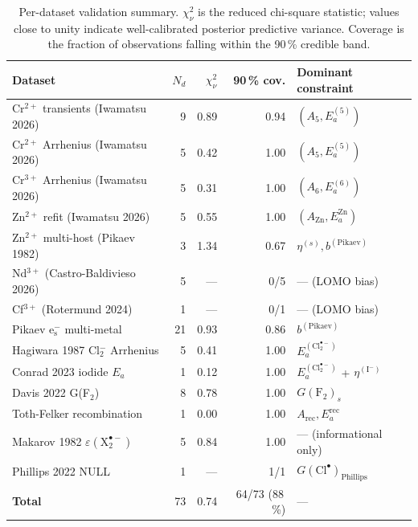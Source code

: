 \documentclass[11pt]{article}
\theoremstyle{plain}
\theoremstyle{definition}
\theoremstyle{remark}
\newcommand{\Clt}{\ensuremath{\mathrm{Cl}_2^{\bullet-}}\xspace}
\newcommand{\Xt}{\ensuremath{\mathrm{X}_2^{\bullet-}}\xspace}
\newcommand{\Ea}{E_a}
\begin{document}
\begin{table}[h!]
\centering
\caption{Per-dataset validation summary.  $\chi^2_\nu$ is the reduced
chi-square statistic; values close to unity indicate well-calibrated
posterior predictive variance.  Coverage is the fraction of observations
falling within the 90\,\% credible band.}
\label{tab:chi2}
\small
\begin{tabular}{lrrrl}
\toprule
Dataset                              & $N_d$ & $\chi^2_\nu$ & 90\,\% cov. & Dominant constraint \\
\midrule
Cr$^{2+}$ transients (Iwamatsu 2026) & 9     & 0.89  & 0.94 & $(A_5, \Ea^{(5)})$ \\
Cr$^{2+}$ Arrhenius (Iwamatsu 2026)  & 5     & 0.42  & 1.00 & $(A_5, \Ea^{(5)})$ \\
Cr$^{3+}$ Arrhenius (Iwamatsu 2026)  & 5     & 0.31  & 1.00 & $(A_6, \Ea^{(6)})$ \\
Zn$^{2+}$ refit (Iwamatsu 2026)      & 5     & 0.55  & 1.00 & $(A_{\mathrm{Zn}}, \Ea^{\mathrm{Zn}})$ \\
Zn$^{2+}$ multi-host (Pikaev 1982)   & 3     & 1.34  & 0.67 & $\eta^{(s)}, b^{(\mathrm{Pikaev})}$ \\
Nd$^{3+}$ (Castro-Baldivieso 2026)   & 5     & ---   & 0/5  & --- (LOMO bias) \\
Cf$^{3+}$ (Rotermund 2024)           & 1     & ---   & 0/1  & --- (LOMO bias) \\
Pikaev e$_{\mathrm{s}}^-$ multi-metal & 21   & 0.93  & 0.86 & $b^{(\mathrm{Pikaev})}$ \\
Hagiwara 1987 Cl$_2^-$ Arrhenius     & 5     & 0.41  & 1.00 & $\Ea^{(\Clt)}$ \\
Conrad 2023 iodide $\Ea$             & 1     & 0.12  & 1.00 & $\Ea^{(\Clt)}$ + $\eta^{(\mathrm{I^-})}$ \\
Davis 2022 G(F$_2$)                  & 8     & 0.78  & 1.00 & $G(\mathrm{F}_2)_s$ \\
Toth-Felker recombination            & 1     & 0.00  & 1.00 & $A_{\mathrm{rec}}, \Ea^{\mathrm{rec}}$ \\
Makarov 1982 $\varepsilon(\Xt)$       & 5     & 0.84  & 1.00 & --- (informational only) \\
Phillips 2022 NULL                   & 1     & ---   & 1/1  & $G(\mathrm{Cl}^{\bullet})_{\mathrm{Phillips}}$ \\
\midrule
\textbf{Total}                       & 73    & 0.74  & 64/73 (88\,\%) & --- \\
\bottomrule
\end{tabular}
\end{table}
\end{document}
